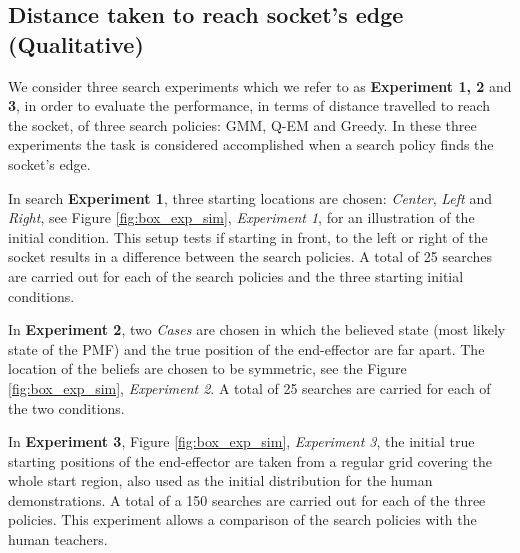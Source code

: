 \subsection{Distance taken to reach socket's edge (Qualitative)}

We consider three search experiments which we refer to as \textbf{Experiment 1, 2} and \textbf{3},
in order to evaluate the performance, in terms of distance travelled to reach the socket, of three search policies: GMM, Q-EM and Greedy.
In these three experiments the task is considered accomplished when a search policy finds the socket's edge. 

In search \textbf{Experiment 1}, three starting locations are chosen: \textit{Center}, \textit{Left} and \textit{Right}, 
see Figure \ref{fig:box_exp_sim}, \textit{Experiment 1}, for an illustration of the initial condition. 
This setup tests if starting in front, to the left or right of the socket results in a difference between the search policies. 
A total of 25 searches are carried out for each of the search policies and the three starting initial conditions.

In \textbf{Experiment 2}, two \textit{Cases} are chosen in which the believed state (most likely state of the PMF) and the true position
of the end-effector are far apart. The location of the beliefs are chosen to be symmetric, see the Figure \ref{fig:box_exp_sim}, 
\textit{Experiment 2}. A total of 25 searches are carried for each of the two conditions.

In \textbf{Experiment 3}, Figure \ref{fig:box_exp_sim}, \textit{Experiment 3}, the initial true starting positions 
of the end-effector are taken from a regular grid covering the whole start region, also used as the initial distribution for 
the human demonstrations. A total of a 150 searches are carried out for each of the three policies. 
This experiment allows a comparison of the search policies with the human teachers.

